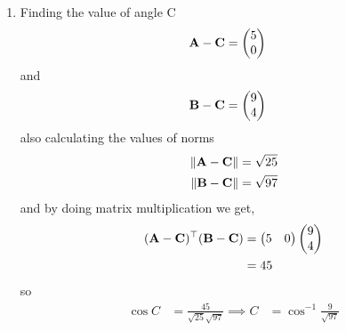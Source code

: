 \documentclass[11pt]{book}
\begin{document}
\begin{enumerate}[label=\thesection.\arabic*.,ref=\thesection.\theenumi]
\begin{enumerate}
\item Finding the value of angle C
\begin{align}
	\mathbf{A}-\mathbf{C} &=\begin{pmatrix}5\\0\end{pmatrix}
\end{align}
and 
\begin{align}
	\mathbf{B}-\mathbf{C}&= \begin{pmatrix}9\\4\end{pmatrix}
\end{align}
also calculating the values of norms
\begin{align}
	\left\lVert\mathbf{A}-\mathbf{C}\right\rVert &= \sqrt{25}\\
	\left\lVert\mathbf{B}-\mathbf{C}\right\rVert &= \sqrt{97}
\end{align}
and by doing matrix multiplication we get,
\begin{align}
\begin{split}
	(\mathbf{A}-\mathbf{C})^{\top}(\mathbf{B}-\mathbf{C})&=\begin{pmatrix}5&0\end{pmatrix}\begin{pmatrix}9\\4\end{pmatrix}\\
	&=45
\end{split}
\end{align}
so 
\begin{align}
	\cos{C}&= \frac{45}{\sqrt{25} \sqrt{97}}
	\implies C&=\cos^{-1}{\frac{9}{\sqrt{97}}}
\end{align}

\end{enumerate}


\end{enumerate}









%
\end{document}
